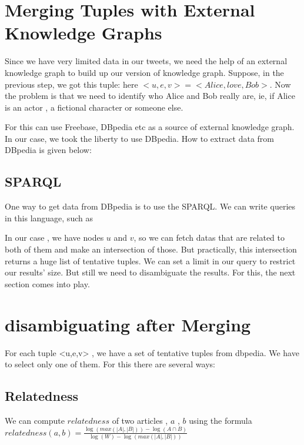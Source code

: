 \section{ Merging Tuples with External Knowledge Graphs }
Since we have very limited data in our tweets, we need the help of an external knowledge graph to build 
up our version of knowledge graph. Suppose, in the previous step, we got this tuple:  here $<u, e, v> = <Alice, love, Bob>$.
Now the problem is that we need to identify who Alice and Bob really are, ie, if Alice is an actor , a fictional character or someone else.

For this can use Freebase, DBpedia etc as a source of external knowledge graph.
In our case, we took the liberty to use DBpedia. How to extract data from DBpedia is given below: 
\subsection{SPARQL}
One way to get data from DBpedia is to use the SPARQL. We can write queries in this language, such as 

In our case , we have nodes $ u $ and $ v $, so we can fetch datas that are related to both of them and make an intersection of those. 
But practically, this intersection returns a huge list of tentative tuples.  We can set a limit in our query to 
restrict our results' size. But still we need to disambiguate the results. For this, the next section comes into play.

\section{ disambiguating after Merging }
For each tuple <u,e,v> , we have a set of tentative tuples from dbpedia. We have to select only one of 
them. For this there are several ways:
\subsection{Relatedness}
 We can compute $ relatedness $ of two articles , $a$ , $b$ using the formula 
  $ relatedness(a,b) = \frac{\log(max(|A|, |B|)) - \log(A \cap B) }{ \log(W) - \log(max(|A|, |B|)) } $


\endinput